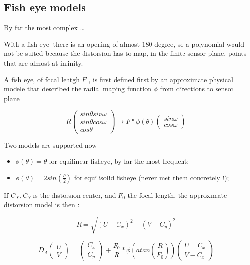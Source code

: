 
\subsection{Fish eye models}

\label{SpGeo:FishEye}

By far the most complex \dots

With a fish-eye, there is  an opening of  almost $180$ degree, so a polynomial
would not be suited because the distorsion has to map, in the finite sensor plane,
points that are almost at infinity.

A fish eye, of focal lentgh $F$ , is first defined first by an approximate physical  modele that described
the radial maping function $\phi$ from directions to sensor plane 

\begin{equation}
    R  \begin{pmatrix}   sin \theta sin \omega \\  sin \theta cos \omega  \\  cos \theta  \end{pmatrix}
   \rightarrow  F * \phi(\theta) \begin{pmatrix} sin \omega \\ cos \omega  \end{pmatrix}
\end{equation}

Two models are  supported now :

\begin{itemize}
   \item $\phi(\theta)=\theta$ for equilinear fisheye, by far the most frequent;
   \item $\phi(\theta)=2 sin(\frac{\theta}{2})$  for equilisolid fisheye (never met
         them concretely !);
\end{itemize}

If $C_X,C_Y$ is the distorsion center,  and $F_0$ the focal length,
the approximate distorsion model is then :

\begin{equation}
   R = \sqrt{(U-C_x)^2 + (V-C_y)^2}
\end{equation}




\begin{equation}
   D_A\begin{pmatrix}U\\V\end{pmatrix}
   = \begin{pmatrix}C_x\\C_y\end{pmatrix}
     +    \frac{F_0}{R} * \phi(atan(\frac{R}{F_0}))  \begin{pmatrix}U-C_x\\ V-C_x\end{pmatrix}
\end{equation}

